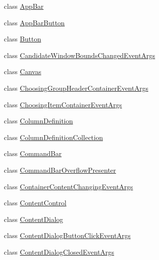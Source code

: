 \begin{DoxyCompactItemize}
\item 
class \hyperlink{class_windows_1_1_u_i_1_1_xaml_1_1_controls_1_1_app_bar}{App\+Bar}
\item 
class \hyperlink{class_windows_1_1_u_i_1_1_xaml_1_1_controls_1_1_app_bar_button}{App\+Bar\+Button}
\item 
class \hyperlink{class_windows_1_1_u_i_1_1_xaml_1_1_controls_1_1_button}{Button}
\item 
class \hyperlink{class_windows_1_1_u_i_1_1_xaml_1_1_controls_1_1_candidate_window_bounds_changed_event_args}{Candidate\+Window\+Bounds\+Changed\+Event\+Args}
\item 
class \hyperlink{class_windows_1_1_u_i_1_1_xaml_1_1_controls_1_1_canvas}{Canvas}
\item 
class \hyperlink{class_windows_1_1_u_i_1_1_xaml_1_1_controls_1_1_choosing_group_header_container_event_args}{Choosing\+Group\+Header\+Container\+Event\+Args}
\item 
class \hyperlink{class_windows_1_1_u_i_1_1_xaml_1_1_controls_1_1_choosing_item_container_event_args}{Choosing\+Item\+Container\+Event\+Args}
\item 
class \hyperlink{class_windows_1_1_u_i_1_1_xaml_1_1_controls_1_1_column_definition}{Column\+Definition}
\item 
class \hyperlink{class_windows_1_1_u_i_1_1_xaml_1_1_controls_1_1_column_definition_collection}{Column\+Definition\+Collection}
\item 
class \hyperlink{class_windows_1_1_u_i_1_1_xaml_1_1_controls_1_1_command_bar}{Command\+Bar}
\item 
class \hyperlink{class_windows_1_1_u_i_1_1_xaml_1_1_controls_1_1_command_bar_overflow_presenter}{Command\+Bar\+Overflow\+Presenter}
\item 
class \hyperlink{class_windows_1_1_u_i_1_1_xaml_1_1_controls_1_1_container_content_changing_event_args}{Container\+Content\+Changing\+Event\+Args}
\item 
class \hyperlink{class_windows_1_1_u_i_1_1_xaml_1_1_controls_1_1_content_control}{Content\+Control}
\item 
class \hyperlink{class_windows_1_1_u_i_1_1_xaml_1_1_controls_1_1_content_dialog}{Content\+Dialog}
\item 
class \hyperlink{class_windows_1_1_u_i_1_1_xaml_1_1_controls_1_1_content_dialog_button_click_event_args}{Content\+Dialog\+Button\+Click\+Event\+Args}
\item 
class \hyperlink{class_windows_1_1_u_i_1_1_xaml_1_1_controls_1_1_content_dialog_closed_event_args}{Content\+Dialog\+Closed\+Event\+Args}

\end{DoxyCompactItemize}
